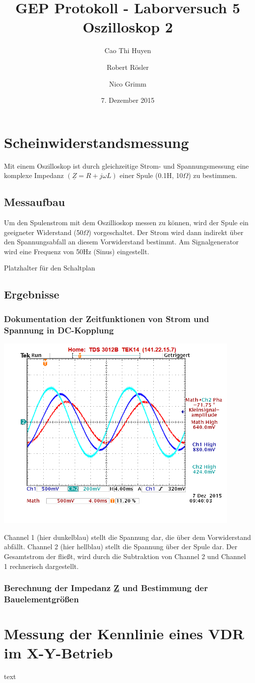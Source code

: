 \documentclass[11pt,a4paper,titlepage]{article}
\begin{document}
\title{GEP Protokoll - Laborversuch 5\\
Oszilloskop 2}
\author{Cao Thi Huyen \and Robert R\"osler \and Nico Grimm}
\date{7. Dezember 2015}
\maketitle
\section{Scheinwiderstandsmessung}
Mit einem Oszilloskop ist durch gleichzeitige Strom- und Spannungsmessung eine komplexe Impedanz \((\underline{Z}=R+j\omega L)\) einer Spule (0.1H, 10$\Omega$) zu bestimmen.
\subsection{Messaufbau}
Um den Spulenstrom mit dem Oszillioskop messen zu k\"onnen, wird der Spule ein geeigneter Widerstand (50$\Omega$) vorgeschaltet. Der Strom wird dann indirekt \"uber den Spannungsabfall an diesem Vorwiderstand bestimmt. Am Signalgenerator wird eine Frequenz von 50Hz (Sinus) eingestellt.
\begin{center}
Platzhalter f\"ur den Schaltplan
\end{center}
\subsection{Ergebnisse}
\subsubsection{Dokumentation der Zeitfunktionen von Strom und Spannung in DC-Kopplung}

\begin{center}
\includegraphics[width=0.9\textwidth]{5_1_1}
\end{center}
Channel 1 (hier dunkelblau) stellt die Spannung dar, die \"uber dem Vorwiderstand abf\"allt. Channel 2 (hier hellblau) stellt die Spannung \"uber der Spule dar. Der Gesamtstrom der flie\ss{}t, wird durch die Subtraktion von Channel 2 und Channel 1 rechnerisch dargestellt.
\newpage
\subsubsection{Berechnung der Impedanz \underline{Z} und Bestimmung der Bauelementgr\"o\ss{}en}

\newpage
\section{Messung der Kennlinie eines VDR im X-Y-Betrieb}
text
\end{document}

